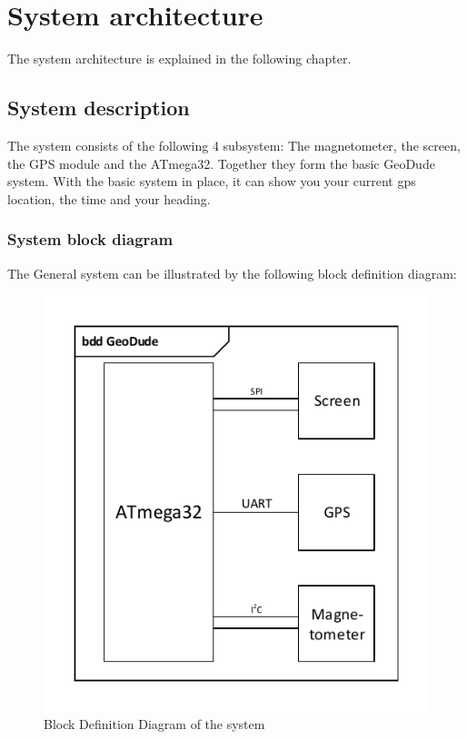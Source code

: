 \chapter{System architecture}
The system architecture is explained in the following chapter.

\section{System description}
The system consists of the following 4 subsystem: The magnetometer, the screen, the GPS module and the ATmega32. Together they form the basic GeoDude system. With the basic system in place, it can show you your current gps location, the time and your heading.\\


\subsection{System block diagram}
The General system can be illustrated by the following block definition diagram:\\
\begin{figure}[H]
	\centering
	\includegraphics[width=.5\textwidth]{billeder/SystemBDD}
	\caption{Block Definition Diagram of the system}
	\label{bdd:system}
\end{figure}

